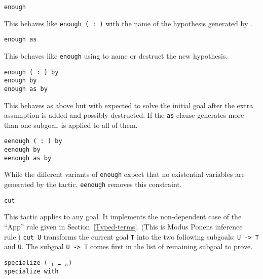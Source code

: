 \begin{coq_example*}
\begin{Variants}
\item \texttt{enough {\form}}

  This behaves like \texttt{enough ({\ident} :\ {\form})} with the name
  {\ident} of the hypothesis generated by {\Coq}.

\item \texttt{enough {\form} as {\intropattern}}

  This behaves like \texttt{enough} {\form} using {\intropattern} to
  name or destruct the new hypothesis.

\item \texttt{enough ({\ident} :\ {\form}) by {\tac}}\\
 \texttt{enough {\form} by {\tac}}\\
 \texttt{enough {\form} as {\intropattern} by {\tac}}

  This behaves as above but with {\tac} expected to solve the initial
  goal after the extra assumption {\form} is added and possibly
  destructed. If the \texttt{as} {\intropattern} clause generates more
  than one subgoal, {\tac} is applied to all of them.

\item \texttt{eenough ({\ident} :\ {\form}) by {\tac}}\\
 \texttt{eenough {\form} by {\tac}}\\
 \texttt{eenough {\form} as {\intropattern} by {\tac}}

  While the different variants of \texttt{enough} expect that no
  existential variables are generated by the tactic, \texttt{eenough}
  removes this constraint.

\item {\tt cut {\form}}

  This tactic applies to any goal. It implements the non-dependent
  case of the ``App'' rule given in
  Section~\ref{Typed-terms}. (This is Modus Ponens inference rule.)
  {\tt cut U} transforms the current goal \texttt{T} into the two
  following subgoals: {\tt U -> T} and \texttt{U}.  The subgoal {\tt U
    -> T} comes first in the list of remaining subgoal to prove.

\item {\tt specialize ({\ident} \term$_1$ \dots\ \term$_n$) }\\
      {\tt specialize {\ident} with {\bindinglist} }


\end{Variants}
\end{coq_example*}
